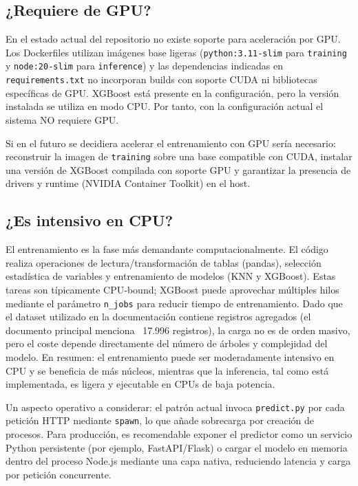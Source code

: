 \documentclass{ULBreport} %
\begin{document}
\subsection{¿Requiere de GPU?}

En el estado actual del repositorio no existe soporte para aceleración por GPU. Los Dockerfiles utilizan imágenes base ligeras (\texttt{python:3.11-slim} para \texttt{training} y \texttt{node:20-slim} para \texttt{inference}) y las dependencias indicadas en \texttt{requirements.txt} no incorporan builds con soporte CUDA ni bibliotecas específicas de GPU. XGBoost está presente en la configuración, pero la versión instalada se utiliza en modo CPU. Por tanto, con la configuración actual el sistema NO requiere GPU.

Si en el futuro se decidiera acelerar el entrenamiento con GPU sería necesario: reconstruir la imagen de \texttt{training} sobre una base compatible con CUDA, instalar una versión de XGBoost compilada con soporte GPU y garantizar la presencia de drivers y runtime (NVIDIA Container Toolkit) en el host.

\subsection{¿Es intensivo en CPU?}

El entrenamiento es la fase más demandante computacionalmente. El código realiza operaciones de lectura/transformación de tablas (pandas), selección estadística de variables y entrenamiento de modelos (KNN y XGBoost). Estas tareas son típicamente CPU‑bound; XGBoost puede aprovechar múltiples hilos mediante el parámetro \texttt{n\_jobs} para reducir tiempo de entrenamiento. Dado que el dataset utilizado en la documentación contiene registros agregados (el documento principal menciona ~17.996 registros), la carga no es de orden masivo, pero el coste depende directamente del número de árboles y complejidad del modelo. En resumen: el entrenamiento puede ser moderadamente intensivo en CPU y se beneficia de más núcleos, mientras que la inferencia, tal como está implementada, es ligera y ejecutable en CPUs de baja potencia.

Un aspecto operativo a considerar: el patrón actual invoca \texttt{predict.py} por cada petición HTTP mediante \texttt{spawn}, lo que añade sobrecarga por creación de procesos. Para producción, es recomendable exponer el predictor como un servicio Python persistente (por ejemplo, FastAPI/Flask) o cargar el modelo en memoria dentro del proceso Node.js mediante una capa nativa, reduciendo latencia y carga por petición concurrente.
\end{document}
